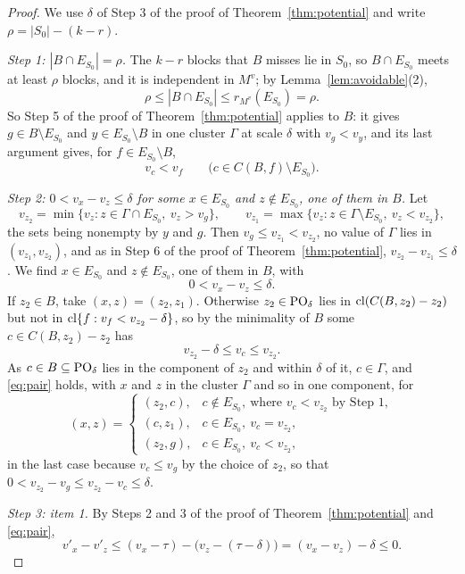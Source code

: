 \begin{proof}
We use $\delta$ of Step 3 of the proof of Theorem~\ref{thm:potential} and write
$\rho=|S_0|-(k-r)$.

\emph{Step 1: $|B\cap E_{S_0}|=\rho$.}  The $k-r$ blocks that $B$ misses lie in $S_0$, so
$B\cap E_{S_0}$ meets at least $\rho$ blocks, and it is independent in $M^{v}$; by
Lemma~\ref{lem:avoidable}(2),
\[
  \rho\le|B\cap E_{S_0}|\le r_{M^{v}}(E_{S_0})=\rho.
\]
So Step 5 of the proof of Theorem~\ref{thm:potential} applies to $B$: it gives
$g\in B\setminus E_{S_0}$ and $y\in E_{S_0}\setminus B$ in one cluster $\Gamma$ at
scale $\delta$ with $v_g<v_y$, and its last argument gives, for
$f\in E_{S_0}\setminus B$,
\[
  v_c<v_f\qquad\bigl(c\in C(B,f)\setminus E_{S_0}\bigr).
\]

\emph{Step 2: $0<v_x-v_z\le\delta$ for some $x\in E_{S_0}$ and $z\notin E_{S_0}$, one of them in $B$.}  Let
\[
  v_{z_2}=\min\{v_z:z\in\Gamma\cap E_{S_0},\ v_z>v_g\},\qquad
  v_{z_1}=\max\{v_z:z\in\Gamma\setminus E_{S_0},\ v_z<v_{z_2}\},
\]
the sets being nonempty by $y$ and $g$.  Then $v_g\le v_{z_1}<v_{z_2}$, no value
of $\Gamma$ lies in $(v_{z_1},v_{z_2})$, and as in Step 6 of the proof of
Theorem~\ref{thm:potential}, $v_{z_2}-v_{z_1}\le\delta$.  We find $x\in E_{S_0}$ and
$z\notin E_{S_0}$, one of them in $B$, with
\begin{equation}
  0<v_x-v_z\le\delta.
  \label{eq:pair}
\end{equation}
If $z_2\in B$, take $(x,z)=(z_2,z_1)$.  Otherwise $z_2\in\mathrm{PO}_\delta$ lies in
$\operatorname{cl}(C(B,z_2)-z_2)$ but not in $\operatorname{cl}\{f:v_f<v_{z_2}-\delta\}$, so by the minimality
of $B$ some $c\in C(B,z_2)-z_2$ has
\[
  v_{z_2}-\delta\le v_c\le v_{z_2}.
\]
As $c\in B\subseteq\mathrm{PO}_\delta$ lies in the component of $z_2$ and within $\delta$
of it, $c\in\Gamma$, and \eqref{eq:pair} holds, with $x$ and $z$ in the cluster
$\Gamma$ and so in one component, for
\[
  (x,z)=
  \begin{cases}
    (z_2,c),&c\notin E_{S_0},\ \text{where }v_c<v_{z_2}\text{ by Step 1},\\
    (c,z_1),&c\in E_{S_0},\ v_c=v_{z_2},\\
    (z_2,g),&c\in E_{S_0},\ v_c<v_{z_2},
  \end{cases}
\]
in the last case because $v_c\le v_g$ by the choice of $z_2$, so that
$0<v_{z_2}-v_g\le v_{z_2}-v_c\le\delta$.

\emph{Step 3: item 1.}  By Steps 2 and 3 of the proof of
Theorem~\ref{thm:potential} and \eqref{eq:pair},
\[
  v'_x-v'_z\le(v_x-\tau)-\bigl(v_z-(\tau-\delta)\bigr)=(v_x-v_z)-\delta\le0.
\]


\end{proof}
